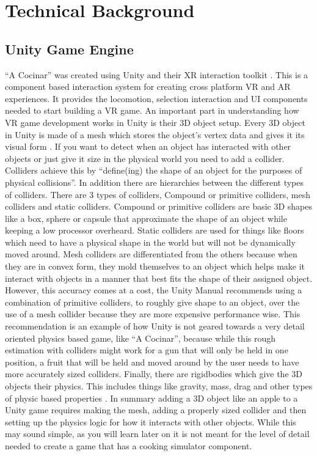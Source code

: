 \documentclass[10pt,twocolumn]{article}
\begin{document}
 

\section{Technical Background}
\subsection{Unity Game Engine}
“A Cocinar” was created using Unity and their XR interaction toolkit \cite{xrUnity2022}. This is a component based interaction system for creating cross platform VR and AR experiences. It provides the locomotion, selection interaction and UI components needed to start building a VR game. An important part in understanding how VR game development works in Unity is their 3D object setup. Every 3D object in Unity is made of a mesh which stores the object's vertex data and gives it its visual form \cite{meshUnity2022}. If you want to detect when an object has interacted with other objects or just give it size in the physical world you need to add a collider. Colliders achieve this by “define(ing) the shape of an object for the purposes of physical collisions”\cite{colliderUnity2022}. In addition there are hierarchies between the different types of colliders. There are 3 types of colliders, Compound or primitive colliders, mesh colliders and static colliders. Compound or primitive colliders are basic 3D shapes like a box, sphere or capsule that approximate the shape of an object while keeping a low processor overheard\cite{introCollisionUnity2022}. Static colliders are used for things like floors which need to have a physical shape in the world but will not be dynamically moved around. Mesh colliders are differentiated from the others because when they are in convex form, they mold themselves to an object which helps make it interact with objects in a manner that best fits the shape of their assigned object. However, this accuracy comes at a cost, the Unity Manual recommends using a combination of primitive colliders, to roughly give shape to an object, over the use of a mesh collider because they are more expensive performance wise\cite{physicsUnity2022}. This recommendation is an example of how Unity is not geared towards a very detail oriented physics based game, like “A Cocinar”, because while this rough estimation with colliders might work for a gun that will only be held in one position, a fruit that will be held and moved around by the user needs to have more accurately sized colliders. Finally, there are rigidbodies which give the 3D objects their physics. This includes things like gravity, mass, drag and other types of physic based properties \cite{rigidBodyUnity2022}. In summary adding a 3D object like an apple to a Unity game requires making the mesh, adding a properly sized collider and then setting up the physics logic for how it interacts with other objects. While this may sound simple, as you will learn later on it is not meant for the level of detail needed to create a game that has a cooking simulator component.
\end{document}
